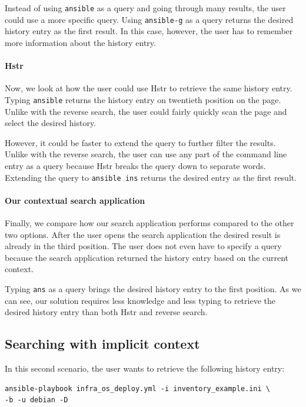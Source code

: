 Instead of using \verb|ansible| as a query and going through many results, the user could use a more specific query. Using \verb|ansible-g| as a query returns the desired history entry as the first result. In this case, however, the user has to remember more information about the history entry.

\paragraph{Hstr}
Now, we look at how the user could use Hstr to retrieve the same history entry.
Typing \verb|ansible| returns the history entry on twentieth position on the page. Unlike with the reverse search, the user could fairly quickly scan the page and select the desired history. 

However, it could be faster to extend the query to further filter the results. Unlike with the reverse search, the user can use any part of the command line entry as a query because Hstr breaks the query down to separate words. Extending the query to \verb|ansible ins| returns the desired entry as the first result.


\paragraph{Our contextual search application}
Finally, we compare how our search application performs compared to the other two options.
After the user opens the search application the desired result is already in the third position. The user does not even have to specify a query because the search application returned the history entry based on the current context.

Typing \verb|ans| as a query brings the desired history entry to the first position. As we can see, our solution requires less knowledge and less typing to retrieve the desired history entry than both Hstr and reverse search. 

\subsection{Searching with implicit context}

In this second scenario, the user wants to retrieve the following history entry:

\begin{verbatim}
ansible-playbook infra_os_deploy.yml -i inventory_example.ini \
-b -u debian -D
\end{verbatim}

